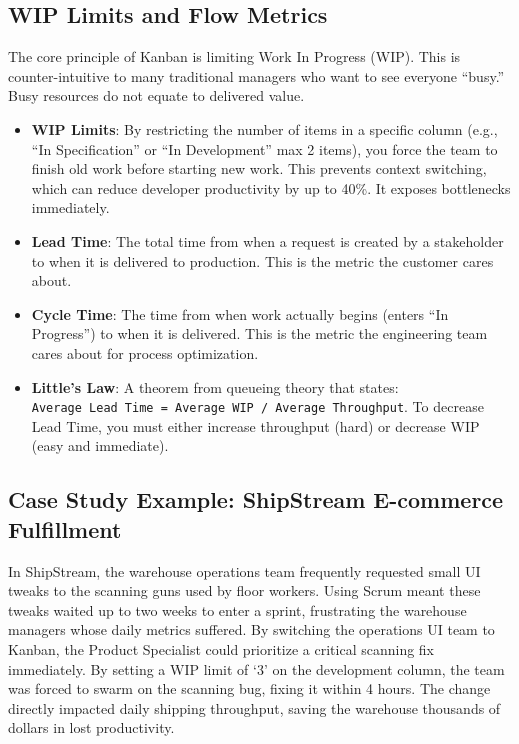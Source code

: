 \subsection{WIP Limits and Flow
Metrics}\label{wip-limits-and-flow-metrics}

The core principle of Kanban is limiting Work In Progress (WIP). This is
counter-intuitive to many traditional managers who want to see everyone
``busy.'' Busy resources do not equate to delivered value.

\begin{itemize}
\tightlist
\item
  \textbf{WIP Limits}: By restricting the number of items in a specific
  column (e.g., ``In Specification'' or ``In Development'' max 2 items),
  you force the team to finish old work before starting new work. This
  prevents context switching, which can reduce developer productivity by
  up to 40\%. It exposes bottlenecks immediately.
\item
  \textbf{Lead Time}: The total time from when a request is created by a
  stakeholder to when it is delivered to production. This is the metric
  the customer cares about.
\item
  \textbf{Cycle Time}: The time from when work actually begins (enters
  ``In Progress'') to when it is delivered. This is the metric the
  engineering team cares about for process optimization.
\item
  \textbf{Little's Law}: A theorem from queueing theory that states:
  \texttt{Average\ Lead\ Time\ =\ Average\ WIP\ /\ Average\ Throughput}.
  To decrease Lead Time, you must either increase throughput (hard) or
  decrease WIP (easy and immediate).
\end{itemize}

\subsection{Case Study Example: ShipStream E-commerce
Fulfillment}\label{case-study-example-shipstream-e-commerce-fulfillment}

In ShipStream, the warehouse operations team frequently requested small
UI tweaks to the scanning guns used by floor workers. Using Scrum meant
these tweaks waited up to two weeks to enter a sprint, frustrating the
warehouse managers whose daily metrics suffered. By switching the
operations UI team to Kanban, the Product Specialist could prioritize a
critical scanning fix immediately. By setting a WIP limit of `3' on the
development column, the team was forced to swarm on the scanning bug,
fixing it within 4 hours. The change directly impacted daily shipping
throughput, saving the warehouse thousands of dollars in lost
productivity.


